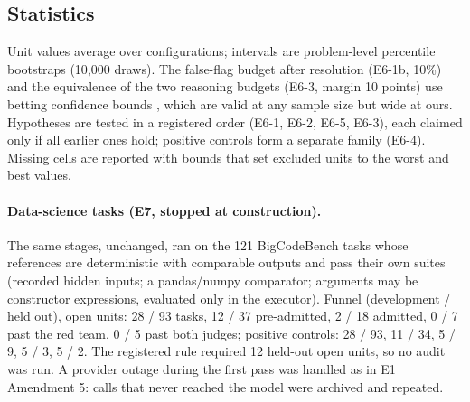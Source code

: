 \subsection{Statistics}

Unit values average over configurations; intervals are problem-level percentile bootstraps (10{,}000 draws). The
false-flag budget after resolution (E6-1b, 10\%) and the equivalence of the two reasoning budgets (E6-3, margin 10
points) use betting confidence bounds \citep{waudbysmith2024betting}, which are valid at any sample size but wide at
ours. Hypotheses are tested in a registered order (E6-1, E6-2, E6-5, E6-3), each claimed only if all earlier ones
hold; positive controls form a separate family (E6-4). Missing cells are reported with bounds that set excluded units
to the worst and best values.

\paragraph{Data-science tasks (E7, stopped at construction).} The same stages, unchanged, ran on the 121
BigCodeBench tasks whose references are deterministic with comparable outputs and pass their own suites (recorded
hidden inputs; a pandas/numpy comparator; arguments may be constructor expressions, evaluated only in the executor).
Funnel (development / held out), open units: 28 / 93 tasks, 12 / 37 pre-admitted, 2 / 18 admitted, 0 / 7 past the
red team, 0 / 5 past both judges; positive controls: 28 / 93, 11 / 34, 5 / 9, 5 / 3, 5 / 2. The registered rule
required 12 held-out open units, so no audit was run. A provider outage during the first pass was handled as in E1
Amendment 5: calls that never reached the model were archived and repeated.

